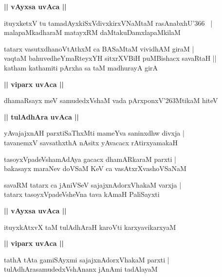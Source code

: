 \documentclass[twoside,12pt,openright]{book}
\def\S{\char'263}
\newcounter{shloka}[chapter]
\def\uvaca#1{\centerline{{\large\textbf{#1}}}}
\begin{document}
\uvaca{|| vAyxsa uvAca ||}

\begin{shloka}%
ituyxketxV tu tamadAyxkiSxVdivxkirxVNaMtaM rasAnabxhU\char'366 ~|\\
malapaMkadharaM matayxRM daMtakuDamxlapaMkilaM 
\end{shloka}

\begin{shloka}%
tatarx vasutxdhanoVtAthxM ca BASaMtaM vividhAM giraM |\\
vaqtaM bahuvedheYmaRteyxYH sitxrXVBiH puMBishacx savaRtaH ||\\
katham kathamiti pArxha sa taM madhurayA girA 
\end{shloka}

\uvaca{|| viparx uvAca ||}

\begin{shloka}%
dhamaRsayx meV samudedxVshaM vada pArxponxV\S MtikaM hiteV 
\end{shloka}

\uvaca{|| tulAdhAra uvAca ||}

\begin{shloka}%
yAvajajxnAH parxtiSaThxMti mameYva saninxdhw divxja |\\
tavanemxV savsathxthA nAsitx yAvacacx rAtirxyamakaH 
\end{shloka}

\begin{shloka}%
tasoyxVpadeVshamAdAya gacacx dhamARkaraM parxti |\\
bakasayx maraNev doVSaM KeV ca vasAtxrXvashoVSaNaM 
\end{shloka}

\begin{shloka}%
savaRM tatarx ca jAniVSeV sajajxnAdorxVhakaM varxja |\\
tatarx tasoyxVpadeVsheVna tava kAmaH PaliSayxti
\end{shloka}

\uvaca{|| vAyxsa uvAca ||}

\begin{shloka}%
ituyxkAtxvX taM tulAdhAraH karoVti karxyavikarxyaM 	
\end{shloka}

\uvaca{|| viparx uvAca ||}

\begin{shloka}%
tathA tAta gamiSAyxmi sajajxnAdorxVhakaM parxti |\\
tulAdhArasamudedxVshAnanx jAnAmi tadAlayaM 
\end{shloka}
\end{document}
